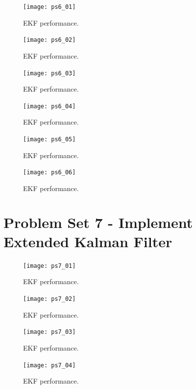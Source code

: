 \documentclass[12pt, letterpaper]{article}
\begin{document}
\begin{figure}[H]
	\centering
	\texttt{[image: ps6\_01]}
	\caption{EKF performance.}
	\label{6:ekf}
\end{figure}


\begin{figure}[H]
	\centering
	\texttt{[image: ps6\_02]}
	\caption{EKF performance.}
	\label{6:ekf}
\end{figure}


\begin{figure}[H]
	\centering
	\texttt{[image: ps6\_03]}
	\caption{EKF performance.}
	\label{6:ekf}
\end{figure}


\begin{figure}[H]
	\centering
	\texttt{[image: ps6\_04]}
	\caption{EKF performance.}
	\label{6:ekf}
\end{figure}


\begin{figure}[H]
	\centering
	\texttt{[image: ps6\_05]}
	\caption{EKF performance.}
	\label{6:ekf}
\end{figure}


\begin{figure}[H]
	\centering
	\texttt{[image: ps6\_06]}
	\caption{EKF performance.}
	\label{6:ekf}
\end{figure}




\section{Problem Set 7 - Implement Extended Kalman Filter}



\begin{figure}[H]
	\centering
	\texttt{[image: ps7\_01]}
	\caption{EKF performance.}
	\label{7:ekf}
\end{figure}


\begin{figure}[H]
	\centering
	\texttt{[image: ps7\_02]}
	\caption{EKF performance.}
	\label{7:ekf}
\end{figure}


\begin{figure}[H]
	\centering
	\texttt{[image: ps7\_03]}
	\caption{EKF performance.}
	\label{7:ekf}
\end{figure}


\begin{figure}[H]
	\centering
	\texttt{[image: ps7\_04]}
	\caption{EKF performance.}
	\label{7:ekf}
\end{figure}
\end{document}
